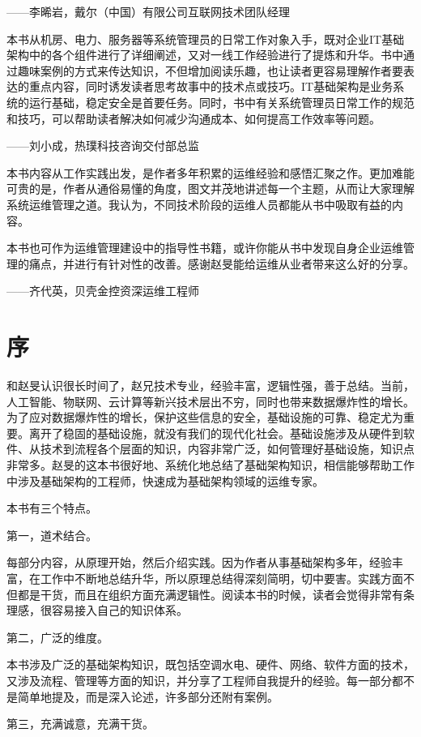 \documentclass[12pt,UTF8]{ctexbook}
\begin{document}
——李晞岩，戴尔（中国）有限公司互联网技术团队经理

本书从机房、电力、服务器等系统管理员的日常工作对象入手，既对企业IT基础架构中的各个组件进行了详细阐述，又对一线工作经验进行了提炼和升华。书中通过趣味案例的方式来传达知识，不但增加阅读乐趣，也让读者更容易理解作者要表达的重点内容，同时诱发读者思考故事中的技术点或技巧。IT基础架构是业务系统的运行基础，稳定安全是首要任务。同时，书中有关系统管理员日常工作的规范和技巧，可以帮助读者解决如何减少沟通成本、如何提高工作效率等问题。

——刘小成，热璞科技咨询交付部总监

本书内容从工作实践出发，是作者多年积累的运维经验和感悟汇聚之作。更加难能可贵的是，作者从通俗易懂的角度，图文并茂地讲述每一个主题，从而让大家理解系统运维管理之道。我认为，不同技术阶段的运维人员都能从书中吸取有益的内容。

本书也可作为运维管理建设中的指导性书籍，或许你能从书中发现自身企业运维管理的痛点，并进行有针对性的改善。感谢赵旻能给运维从业者带来这么好的分享。

——齐代英，贝壳金控资深运维工程师

\chapter{序}

和赵旻认识很长时间了，赵兄技术专业，经验丰富，逻辑性强，善于总结。当前，人工智能、物联网、云计算等新兴技术层出不穷，同时也带来数据爆炸性的增长。为了应对数据爆炸性的增长，保护这些信息的安全，基础设施的可靠、稳定尤为重要。离开了稳固的基础设施，就没有我们的现代化社会。基础设施涉及从硬件到软件、从技术到流程各个层面的知识，内容非常广泛，如何管理好基础设施，知识点非常多。赵旻的这本书很好地、系统化地总结了基础架构知识，相信能够帮助工作中涉及基础架构的工程师，快速成为基础架构领域的运维专家。

本书有三个特点。

第一，道术结合。

每部分内容，从原理开始，然后介绍实践。因为作者从事基础架构多年，经验丰富，在工作中不断地总结升华，所以原理总结得深刻简明，切中要害。实践方面不但都是干货，而且在组织方面充满逻辑性。阅读本书的时候，读者会觉得非常有条理感，很容易接入自己的知识体系。

第二，广泛的维度。

本书涉及广泛的基础架构知识，既包括空调水电、硬件、网络、软件方面的技术，又涉及流程、管理等方面的知识，并分享了工程师自我提升的经验。每一部分都不是简单地提及，而是深入论述，许多部分还附有案例。

第三，充满诚意，充满干货。
\end{document}
